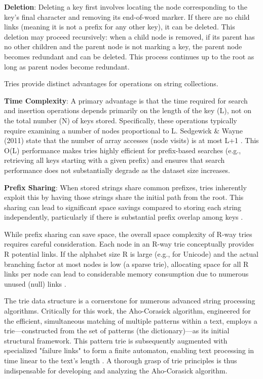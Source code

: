 \textbf{Deletion}: Deleting a key first involves locating the node corresponding to the key's final character and removing its end-of-word marker. If there are no child links (meaning it is not a prefix for any other key), it can be deleted. This deletion may proceed recursively: when a child node is removed, if its parent has no other children and the parent node is not marking a key, the parent node becomes redundant and can be deleted. This process continues up to the root as long as parent nodes become redundant.


Tries provide distinct advantages for operations on string collections.

\textbf{Time Complexity}: A primary advantage is that the time required for search and insertion operations depends primarily on the length of the key (L), not on the total number (N) of keys stored. Specifically, these operations typically require examining a number of nodes proportional to L. Sedgewick \& Wayne (2011) state that the number of array accesses (node visits) is at most L+1 \cite{SedgewickWayne2011}. This O(L) performance makes tries highly efficient for prefix-based searches (e.g., retrieving all keys starting with a given prefix) and ensures that search performance does not substantially degrade as the dataset size increases.

\textbf{Prefix Sharing}: When stored strings share common prefixes, tries inherently exploit this by having those strings share the initial path from the root. This sharing can lead to significant space savings compared to storing each string independently, particularly if there is substantial prefix overlap among keys \cite{Fredkin1960}.


While prefix sharing can save space, the overall space complexity of R-way tries requires careful consideration. Each node in an R-way trie conceptually provides R potential links. If the alphabet size R is large (e.g., for Unicode) and the actual branching factor at most nodes is low (a sparse trie), allocating space for all R links per node can lead to considerable memory consumption due to numerous unused (null) links \cite{Knuth1998, SedgewickWayne2011}.


The trie data structure is a cornerstone for numerous advanced string processing algorithms. Critically for this work, the Aho-Corasick algorithm, engineered for the efficient, simultaneous matching of multiple patterns within a text, employs a trie---constructed from the set of patterns (the dictionary)---as its initial structural framework. This pattern trie is subsequently augmented with specialized "failure links" to form a finite automaton, enabling text processing in time linear to the text's length \cite{AhoCorasick1975}. A thorough grasp of trie principles is thus indispensable for developing and analyzing the Aho-Corasick algorithm.

